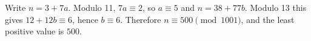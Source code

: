 Write $n=3+7a$. Modulo 11, $7a\equiv2$, so $a\equiv5$ and $n=38+77b$. Modulo 13 this gives $12+12b\equiv6$, hence $b\equiv6$. Therefore $n\equiv500\pmod{1001}$, and the least positive value is $\boxed{500}$.
